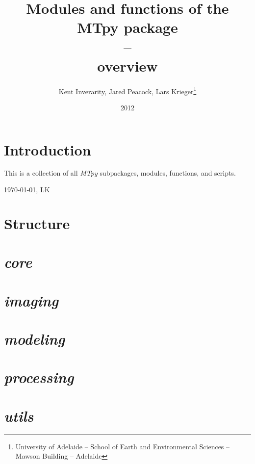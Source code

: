 \documentclass[%
onecolumn,%
11pt,%
DIV12%
]{scrreprt}
\title  {Modules and functions of the MTpy package \\ -- \\ overview}
\author{Kent Inverarity, Jared Peacock, Lars Krieger\thanks{University of Adelaide -- School of Earth and Environmental Sciences -- Mawson Building -- Adelaide}
  }
\date{2012}
\begin{document}
\linenumbers

\maketitle

\chapter*{Introduction}

This is a collection of all \textit{MTpy} subpackages, modules, functions, and scripts. 

\vspace{4cm}
{\small \today, LK} 

\tableofcontents

\chapter{Structure}
\label{ch:Structure}



\chapter{ \textit{core} }
\label{ch:core}


\chapter{ \textit{imaging} }
\label{ch:imaging}


\chapter{ \textit{modeling} }
\label{ch:modeling}


\chapter{ \textit{processing} }
\label{ch:processing}


\chapter{ \textit{utils} }
\label{ch:utils}

\end{document}
